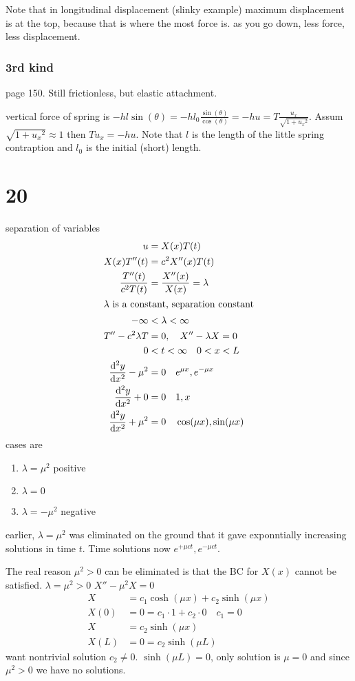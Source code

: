 \documentclass{article}
\begin{document}
Note that in longitudinal displacement (slinky example) maximum displacement is at the top, because that is where the most force is. as you go down, less force, less displacement.

\subsubsection*{3rd kind}
page 150. Still frictionless, but elastic attachment.

vertical force of spring is $-hl\sin(\theta)=-hl_0\frac{\sin(\theta)}{\cos(\theta)}=-hu=T\frac{u_x}{\sqrt{1+{u_x}^2}}$. Assum $\sqrt{1+{u_x}^2}\approx 1$ then $Tu_x=-hu$. Note that $l$ is the length of the little spring contraption and $l_0$ is the initial (short) length.
\section*{20}
separation of variables
\begin{align*}
  u&=X(x)T(t)\\
  X(x)T''(t)&=c^2X''(x)T(t)\\
  \frac{T''(t)}{c^2T(t)}&=\frac{X''(x)}{X(x)}=\lambda\\
  \intertext{$\lambda$ is a constant, separation constant}
  -\infty&<\lambda<\infty\\
  T''-c^2\lambda T&=0,\quad X''-\lambda X=0\\
  0&<t<\infty\quad 0<x<L\\
  \frac{\mathrm{d}^2y}{\mathrm{d}x^2}-\mu^2&=0\quad e^{\mu x},e^{-\mu x}\\
  \frac{\mathrm{d}^2y}{\mathrm{d}x^2}+0&=0\quad 1,x\\
  \frac{\mathrm{d}^2y}{\mathrm{d}x^2}+\mu^2&=0\quad \cos(\mu x),\sin(\mu x)\\
\end{align*}
cases are
\begin{enumerate}
\item
$\lambda=\mu^2$ positive
\item
$\lambda=0$
\item
$\lambda=-\mu^2$ negative
\end{enumerate}
earlier, $\lambda=\mu^2$ was eliminated on the ground that it gave exponntially increasing solutions in time $t$. Time solutions now $e^{+\mu ct},e^{-\mu ct}$.

The real reason $\mu^2>0$ can be eliminated is that the BC for $X(x)$ cannot be satisfied. $\lambda=\mu^2>0$ $X''-\mu^2X=0$
\begin{align*}
  X&=c_1\cosh(\mu x)+c_2\sinh(\mu x)\\
  X(0)&=0=c_1\cdot1+c_2\cdot0\quad c_1=0\\
  X&=c_2\sinh(\mu x)\\
  X(L)&=0=c_2\sinh(\mu L)
\end{align*}
want nontrivial solution $c_2\ne0$. $\sinh(\mu L)=0$, only solution is $\mu=0$ and since $\mu^2>0$ we have no solutions.
\end{document}
